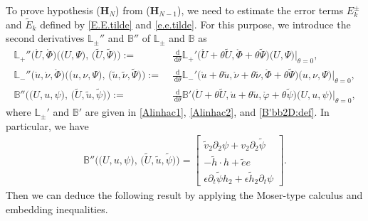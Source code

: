 \documentclass[twoside,11pt]{article}
\numberwithin{equation}{section}
\def\d{\,\mathrm{d}}
\def\p{\partial}
\begin{document}
To prove hypothesis ($\mathbf{H}_{{N}}$) from ($\mathbf{H}_{{N}-1}$),
we need to estimate the error terms $E_{k}^{\pm}$ and $\widetilde{E}_{k}$ defined by \eqref{E.E.tilde} and \eqref{e.e.tilde}.
For this purpose, we introduce the second derivatives $\mathbb{L}_{\pm}''$ and $\mathbb{B}''$ of  $\mathbb{L}_{\pm}$ and $\mathbb{B}$ as
\begin{align*}
	\mathbb{L}_+''\big(\mathring{U},\mathring{\Phi}\big)
	\big(\big(U,\Psi\big),\, \big(\widetilde{U},\widetilde{\Psi}\big)\big)
	:=\;& \frac{\d}{\d \theta}
	\mathbb{L}_+'\big(\mathring{U}+\theta \widetilde{U},
	\mathring{\Phi}+\theta \widetilde{\Psi}\big)
	\big(U,\Psi\big)\Big|_{\theta=0},\\[0.5mm]
	\mathbb{L}_-''\big(\mathring{u},\mathring{\nu},\mathring{\Phi}\big)
	\big(\big(u,\nu, \Psi\big),\, \big(\tilde{u},\tilde{\nu},\widetilde{\Psi}\big)\big)
	:= \;&\frac{\d}{\d \theta}
	\mathbb{L}_-'\big(\mathring{u}+\theta \tilde{u},\mathring{\nu}+\theta \tilde{\nu},
	\mathring{\Phi}+\theta \widetilde{\Psi}\big)
	\big(u,\nu,\Psi\big)\Big|_{\theta=0},	
	\\[0.5mm]
	\mathbb{B}''
	\big(\big(U, u, \psi\big),\, \big(\widetilde{U},\tilde{u},\tilde{\psi}\big)\big)
	:= \;& \frac{\d}{\d \theta}
	\mathbb{B}'\big(\mathring{U}+\theta \widetilde{U},
	\mathring{u}+\theta \tilde{u},
	\mathring{\varphi}+\theta \tilde{\psi}\big)\big(U,u,\psi\big)\Big|_{\theta=0},
\end{align*}
where $\mathbb{L}_{\pm}'$ and $\mathbb{B}'$ are given in \eqref{Alinhac1}, \eqref{Alinhac2}, and \eqref{B'bb2D:def}.
In particular, we have
\begin{align}
	\label{B'':def}
	\mathbb{B}''
	\big(\big(U, u, \psi\big),\, \big(\widetilde{U},\tilde{u},\tilde{\psi}\big)\big)
	=\begin{bmatrix}
		\tilde{v}_2\p_2 \psi+ v_2\p_2 \tilde{\psi}\\[1mm]
		-\tilde{h}\cdot h+\tilde{e}e\\[1mm]
		\epsilon\p_t \tilde{\psi}h_2+\epsilon\tilde{h}_2\p_t \psi
	\end{bmatrix}.	
\end{align}
Then we can deduce the following result by
applying the Moser-type calculus and embedding inequalities. %
\end{document}
